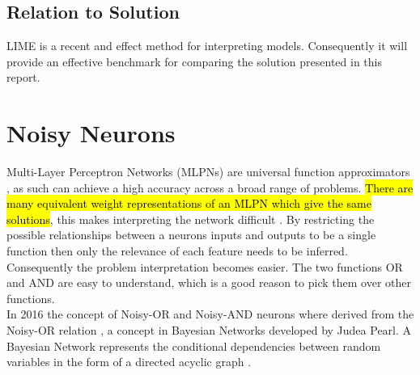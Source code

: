 \subsection{Relation to Solution}
LIME is a recent and effect method for interpreting models. Consequently it will provide an effective benchmark for comparing the solution presented in this report.

\section{Noisy Neurons} \label{sec:background-noisy-neurons}
Multi-Layer Perceptron Networks (MLPNs) are universal function approximators \cite{hornik1989multilayer}, as such can achieve a high accuracy across a broad range of problems. \hl{There are many equivalent weight representations of an MLPN which give the same solutions}, this makes interpreting the network difficult \cite{LearningLogicalActivations}. By restricting the possible relationships between a neurons inputs and outputs to be a single function then only the relevance of each feature needs to be inferred. Consequently the problem interpretation becomes easier. The two functions OR and AND are easy to understand, which is a good reason to pick them over other functions.\\

In 2016 the concept of Noisy-OR and Noisy-AND neurons \cite{LearningLogicalActivations} where derived from the Noisy-OR relation \cite{russell1995modern}, a concept in Bayesian Networks developed by Judea Pearl. A Bayesian Network represents the conditional dependencies between random variables in the form of a directed acyclic graph \cite{neapolitan2004learning}.

